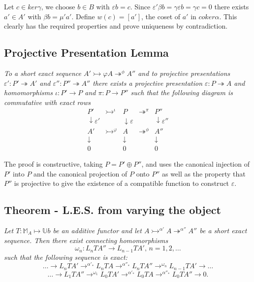 Let $c\in ker\gamma$, we choose $b\in B$ with $\varepsilon b = c$.
Since $\varepsilon'\beta b = \gamma \varepsilon b = \gamma c = 0$
there exists $a'\in A'$ with $\beta b = \mu' a'$. Define $w(c) =
[a']$, the coset of $a'$ in $coker \alpha$. This clearly has the
required properties  and prove uniqueness by contradiction.

\subsection{Projective Presentation Lemma}\label{df1.5.2}
\emph{To a short exact sequence $ A'\rightarrowtail\varphi
A\twoheadrightarrow^\phi A''$ and to projective presentations
$\varepsilon':P'\twoheadrightarrow A'$ and
$\varepsilon'':P''\twoheadrightarrow A''$ there exists a
projective presentation $\varepsilon:P\twoheadrightarrow A$ and
homomorphisms $\iota:P'\rightarrow P$ and $\pi:P\rightarrow P''$
such that the following diagram is commutative with exact rows
$$\begin{array}{ccccc}
  P' & \rightarrowtail^\iota & P & \twoheadrightarrow^\pi & P'' \\
  \downarrow \varepsilon' &  & \downarrow \varepsilon &  & \downarrow \varepsilon'' \\
  A' & \rightarrowtail^\varphi & A & \twoheadrightarrow^\phi & A'' \\
  \downarrow &                 &\downarrow &
  &\downarrow\\
  0 & & 0 & & 0
\end{array}$$
}

The proof is constructive, taking $P = P'\oplus P''$, and uses the
canonical injection of $P'$ into $P$ and the canonical projection
of $P$ onto $P''$ as well as the property that $P''$ is projective
to give the existence of a compatible function to construct
$\varepsilon$.





\subsection{Theorem - L.E.S. from varying the object}\label{df1.5.3}
\emph{Let $T:\mathbb M_A\mapsto \mathbb U b$ be an additive
functor and let
$A\rightarrowtail^{\alpha'}A\twoheadrightarrow^{\alpha''}A''$ be a
short exact sequence. Then there exist connecting homomorphisms
$$\omega_n: L_nTA''\rightarrow L_{n-1}TA',\,n=1,2,\dots$$
such that the following sequence is exact:
$$\dots\rightarrow L_nTA'\rightarrow^{\alpha'_*} L_nTA
\rightarrow^{\alpha''_*}L_nTA''\rightarrow^{\omega_n}
L_{n-1}TA'\rightarrow\dots$$
$$\dots \rightarrow L_1TA''\rightarrow^{\omega_1}
L_0TA'\rightarrow^{\alpha'_*}L_0TA\rightarrow^{\alpha''_*}L_0TA''\rightarrow
0.$$}


